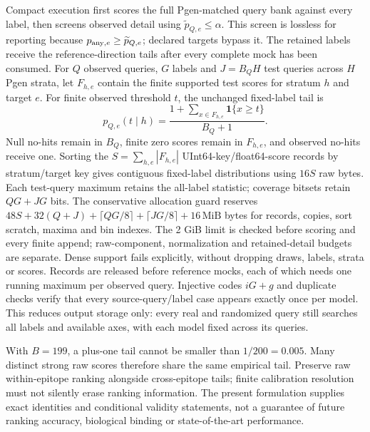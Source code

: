 \documentclass[10pt,a4paper]{article}
\theoremstyle{definition}
\begin{document}
Compact execution first scores the full Pgen-matched query bank against every label, then screens observed detail using $\widetilde p_{Q,e}\le\alpha$.
This screen is lossless for reporting because $p_{{\rm any},e}\ge\widetilde p_{Q,e}$; declared targets bypass it.
The retained labels receive the reference-direction tails after every complete mock has been consumed.
For $Q$ observed queries, $G$ labels and $J=B_QH$ test queries across $H$ Pgen strata, let $F_{h,e}$ contain the finite supported test scores for stratum $h$ and target $e$.
For finite observed threshold $t$, the unchanged fixed-label tail is
\[
 p_{Q,e}(t\mid h)=\frac{1+\sum_{x\in F_{h,e}}\mathbf1\{x\ge t\}}{B_Q+1}.
\]
Null no-hits remain in $B_Q$, finite zero scores remain in $F_{h,e}$, and observed no-hits receive one.
Sorting the $S=\sum_{h,e}|F_{h,e}|$ UInt64-key/float64-score records by stratum/target key gives contiguous fixed-label distributions using $16S$ raw bytes.
Each test-query maximum retains the all-label statistic; coverage bitsets retain $QG+JG$ bits.
The conservative allocation guard reserves $48S+32(Q+J)+\lceil QG/8\rceil+\lceil JG/8\rceil+16\,\mathrm{MiB}$ bytes for records, copies, sort scratch, maxima and bin indexes.
The 2 GiB limit is checked before scoring and every finite append; raw-component, normalization and retained-detail budgets are separate.
Dense support fails explicitly, without dropping draws, labels, strata or scores.
Records are released before reference mocks, each of which needs one running maximum per observed query.
Injective codes $iG+g$ and duplicate checks verify that every source-query/label case appears exactly once per model.
This reduces output storage only: every real and randomized query still searches all labels and available axes, with each model fixed across its queries.

With $B=199$, a plus-one tail cannot be smaller than $1/200=0.005$.
Many distinct strong raw scores therefore share the same empirical tail.
Preserve raw within-epitope ranking alongside cross-epitope tails; finite calibration resolution must not silently erase ranking information.
The present formulation supplies exact identities and conditional validity statements, not a guarantee of future ranking accuracy, biological binding or state-of-the-art performance.
\end{document}
